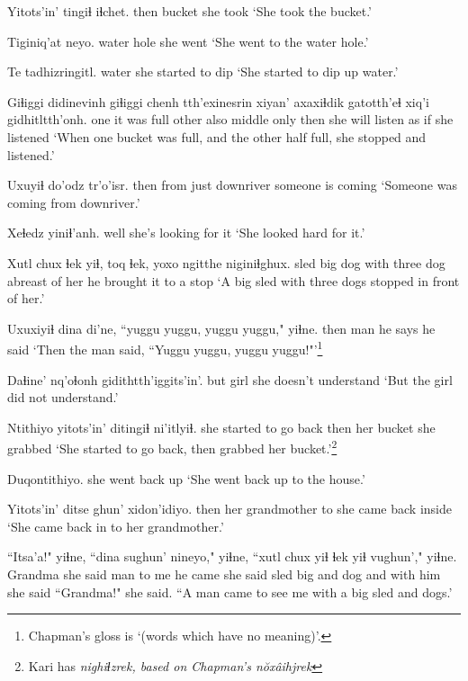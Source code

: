 \documentclass[12pt]{article}
\begin{document}
\gll Yitots'in' tingiɬ iɬchet.
then bucket {she took}
\glt `She took the bucket.'
\glend

\gll Tiginiq'at neyo.
{water hole} {she went}
\glt `She went to the water hole.'
\glend

\gll Te tadhizringitl.
water {she started to dip}
\glt `She started to dip up water.'
\glend

\gll Giɬiggi didinevinh giɬiggi chenh tth'exinesrin xiyan' axaxiɬdik gatotth'eɬ xiq'i gidhitltth'onh.
one {it was full} other also middle only then {she will listen} {as if} {she listened}
\glt `When one bucket was full, and the other half full, she stopped and listened.'
\glend

\gll Uxuyiɬ do'odz tr'o'isr.
then {from just downriver} {someone is coming}
\glt `Someone was coming from downriver.'
\glend

\gll Xeɬedz yiniɬ'anh.
well {she's looking for it}
\glt `She looked hard for it.'
\glend

\gll Xutl chux ɬek yiɬ, toq ɬek, {yoxo ngitthe} niginiɬghux.
sled big dog with three dog {abreast of her} {he brought it to a stop}
\glt `A big sled with three dogs stopped in front of her.'
\glend

\gll Uxuxiyiɬ dina di'ne, {``yuggu yuggu, yuggu yuggu,"} yiɬne.
then man {he says} {} {he said}
\glt `Then the man said, ``Yuggu yuggu, yuggu yuggu!"'\footnote{Chapman's gloss is `(words which have no meaning)'. }
\glend

\gll Daɬine' nq'oɬonh gidithtth'iggits'in'.
but girl {she doesn't understand}
\glt `But the girl did not understand.'
\glend

\gll Ntithiyo yitots'in' ditingiɬ ni'itlyiɬ.
{she started to go back} then {her bucket} {she grabbed}
\glt `She started to go back, then grabbed her bucket.'\footnote{Kari has \em nighiɬzrek, \em based on Chapman's \em n\u{o}x\^aihjrek}
\glend

\gll Duqontithiyo.
{{she went back up}}
\glt `She went back up to the house.'
\glend

\gll Yitots'in' ditse ghun' xidon'idiyo.
then {her grandmother} to {she came back inside}
\glt `She came back in to her grandmother.'
\glend

\gll ``Itsa'a!" yiɬne, ``dina sughun' nineyo," yiɬne, ``xutl chux yiɬ ɬek yiɬ vughun'," yiɬne.
{Grandma} {she said} man {to me} {he came} {she said} sled big and dog and {with him} {she said}
\glt ``Grandma!" she said. ``A man came to see me with a big sled and dogs.'
\glend
\end{document}
